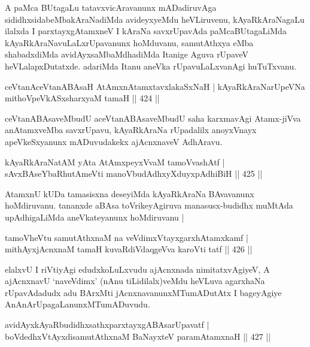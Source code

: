 \begin{artha}
A paMca BUtagaLu tatavxvicAravanunx mADadiruvAga sididhxsidabeMbakAraNa\-diMda avideyxyeMdu heVLiruvenu, kAyaRkAraNagaLu ilalxda I parxtayxgAtamxneV  I kAraNa savxrUpavAda paMcaBUtagaLiMda kAyaRkAraNavuLaLxrUpavanunx hoMduvanu, samutAthxya eMba shabadxdiMda avidAyxsaMbaMdhadiMda Itanige Aguva rUpaveV heVLalapxDutatxde. adariMda Itanu aneVka rUpavuLaLxvanAgi huTuTxvanu.
\end{artha}


\begin{shl}
ceVtanAceVtanABAsaH AtAmxnAtamxtavxlakaSxNaH |
kAyaRkAraNarUpeVNa mithoVpeVkASxsharxyaM tamaH \hfill  || 424 ||
\end{shl}

\begin{artha}
ceVtanABAsaveMbudU aceVtanABAsaveMbudU saha karxmavAgi Atamx-jiVva anAtamxveMba savxrUpavu, kAyaRkAraNa rUpadalilx  anoyxVnayx apeVkeSxyanunx mADuvudakekx ajAcnxnaveV AdhAravu.
\end{artha}

\begin{shl}
kAyaRkAraNatAM yAta AtAmx\s peyxVvaM tamoVvashAtf |
sAvxBAseYbaRhutAmeVti manoVbudAdhxyXduyxpAdhiBiH \hfill  || 425 ||
\end{shl}

\begin{artha}
AtamxnU kUDa tamasisxna deseyiMda kAyaRkAraNa BAvavanunx
hoMdiru\-vanu. tananxde aBAsa toVrikeyAgiruva manasusx-budidhx muMtAda
upAdhi\-gaLiMda aneVkateyanunx hoMdiruvanu |
\end{artha}

\begin{shl}
tamoVheVtu samutAthxnaM na veVdimxVtayxgarxhAtamxkamf |
mithAyxjAcnxnaM tamaH kuvaRdiVdaqgeVva karoVti tatf \hfill  || 426 ||
\end{shl}

\begin{artha}
elalxvU I riVtiyAgi edudxkoLuLxvudu ajAcnxnada nimitatxvAgiyeV, A \break ajAcnxnavU `naveVdimx' (nAnu tiLidilalx)veMdu heVLuva agarxhaNa rUpavAdadudx adu BArxMti jAcnxnavanunxMTumADutAtx I bageyAgiye AnAnArUpagaLanunxMTu\-mADuvudu.
\end{artha}

\begin{shl}
avidAyxkAyaRbudidhxsathxparxtayxgABAsarUpavatf |
boVdedhxVtAyxdisamutAthxnaM BaNayxteV paramAtamxnaH \hfill  || 427 ||
\end{shl}


